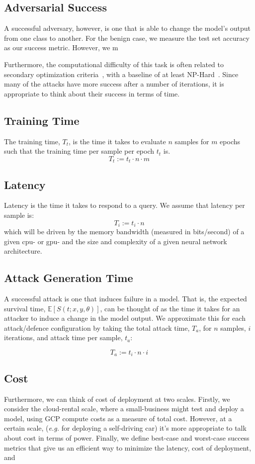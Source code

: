 \documentclass[conference]{IEEEtran}
\begin{document}
\subsection{Adversarial Success}
A successful adversary, however, is one that is able to change the model's output from one class to another. For the benign case, we measure the test set accuracy as our success metric. However, we m

Furthermore, the computational difficulty of this task is often related to secondary optimization criteria~\cite{}, with a baseline of at least NP-Hard~\cite{madry2017towards}. Since many of the attacks have more success after a number of iterations\cite{fgm,deepfool,carlini_towards_2017,madry2017towards,hopskipjump}, it is appropriate to think about their success in terms of time.



\subsection{Training Time}
The training time, $T_t$, is the time it takes to evaluate $n$ samples for $m$ epochs such that the training time per sample per epoch $t_t$ is.
$$
T_t := t_t\cdot n\cdot m
$$

\subsection{Latency}
Latency is the time it takes to respond to a query. We assume that latency per sample is:
$$
T_i  := t_i \cdot n 
$$
which will be driven by the memory bandwidth (measured in bits/second) of a given cpu- or gpu-\cite{} and the size\cite{} and complexity\cite{} of a given neural network architecture.

\subsection{Attack Generation Time}
A successful attack is one that induces failure in a model. That is, the expected survival time, $\mathbb{E}[S(t;x,y,\theta)]$, can be thought of as the time it takes for an attacker to induce a change in the model output. We approximate this for each attack/defence configuration by taking the total attack time, $T_a$, for $n$ samples, $i$ iterations, and attack time per sample, $t_a$:

$$
T_a := t_i \cdot n \cdot i 
$$



\subsection{Cost}
Furthermore, we can think of cost of deployment at two scales. Firstly, we consider the cloud-rental scale, where a small-business might test and deploy a model, using GCP compute costs as a measure of total cost. However, at a certain scale, (\textit{e.g.} for deploying a self-driving car) it's more appropriate to talk about cost in terms of power. Finally, we define best-case and worst-case success metrics that give us an efficient way to minimize the latency, cost of deployment, and 
\end{document}
